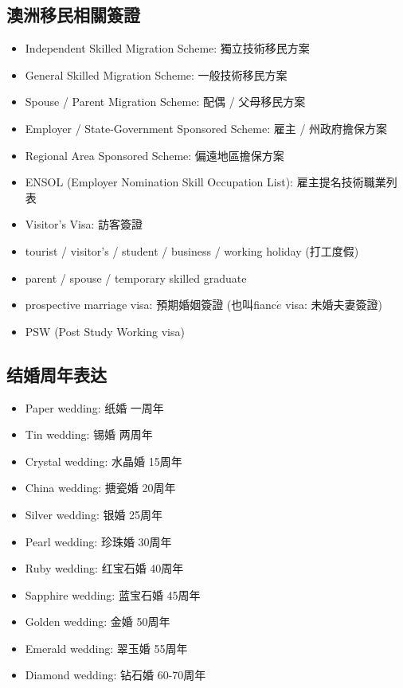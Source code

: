 \subsection{澳洲移民相關簽證}
\begin{itemize}
  \itemsep0em
  \item Independent Skilled Migration Scheme: 獨立技術移民方案
  \item General Skilled Migration Scheme: 一般技術移民方案
  \item Spouse / Parent Migration Scheme: 配偶 / 父母移民方案
  \item Employer / State-Government Sponsored Scheme: 雇主 / 州政府擔保方案
  \item Regional Area Sponsored Scheme: 偏遠地區擔保方案
  \item ENSOL (Employer Nomination Skill Occupation List): 雇主提名技術職業列表
  \item Visitor's Visa: 訪客簽證
  \item tourist / visitor's / student / business / working holiday (打工度假)
  \item parent / spouse / temporary skilled graduate
  \item prospective marriage visa: 預期婚姻簽證 (也叫fianc$\acute{e}$ visa: 未婚夫妻簽證)
  \item PSW (Post Study Working visa)
\end{itemize}

\subsection{结婚周年表达}
\begin{multicols}{2}
\begin{itemize}
  \itemsep0em
  \item Paper wedding: 纸婚 一周年
  \item Tin wedding: 锡婚 两周年
  \item Crystal wedding: 水晶婚 15周年
  \item China wedding: 搪瓷婚 20周年
  \item Silver wedding: 银婚 25周年
  \item Pearl wedding: 珍珠婚 30周年
  \item Ruby wedding: 红宝石婚 40周年
  \item Sapphire wedding: 蓝宝石婚 45周年
  \item Golden wedding: 金婚 50周年
  \item Emerald wedding: 翠玉婚 55周年
  \item Diamond wedding: 钻石婚 60-70周年
\end{itemize}
\end{multicols}

